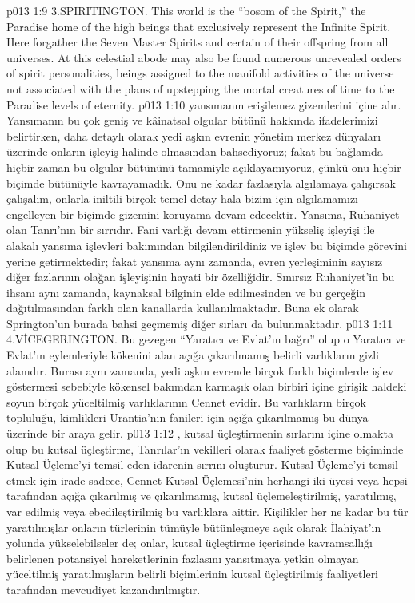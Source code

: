 \vs p013 1:9 3.\bibnobreakspace SPIRITINGTON. This world is the “bosom of the Spirit,” the Paradise home of the high beings that exclusively represent the Infinite Spirit. Here forgather the Seven Master Spirits and certain of their offspring from all universes. At this celestial abode may also be found numerous unrevealed orders of spirit personalities, beings assigned to the manifold activities of the universe not associated with the plans of upstepping the mortal creatures of time to the Paradise levels of eternity.
\vs p013 1:10  yansımanın erişilemez gizemlerini içine alır. Yansımanın bu çok geniş ve kâinatsal olgular bütünü hakkında ifadelerimizi belirtirken, daha detaylı olarak yedi aşkın evrenin yönetim merkez dünyaları üzerinde onların işleyiş halinde olmasından bahsediyoruz; fakat bu bağlamda hiçbir zaman bu olgular bütününü tamamiyle açıklayamıyoruz, çünkü onu hiçbir biçimde bütünüyle kavrayamadık. Onu ne kadar fazlasıyla algılamaya çalışırsak çalışalım, onlarla iniltili birçok temel detay hala bizim için algılamamızı engelleyen bir biçimde gizemini koruyama devam edecektir. Yansıma, Ruhaniyet olan Tanrı’nın bir sırrıdır. Fani varlığı devam ettirmenin yükseliş işleyişi ile alakalı yansıma işlevleri bakımından bilgilendirildiniz ve işlev bu biçimde görevini yerine getirmektedir; fakat yansıma aynı zamanda, evren yerleşiminin sayısız diğer fazlarının olağan işleyişinin hayati bir özelliğidir. Sınırsız Ruhaniyet’in bu ihsanı aynı zamanda, kaynaksal bilginin elde edilmesinden ve bu gerçeğin dağıtılmasından farklı olan kanallarda kullanılmaktadır. Buna ek olarak Springton’un burada bahsi geçmemiş diğer sırları da bulunmaktadır.
\vs p013 1:11 4.\bibnobreakspace VİCEGERINGTON. Bu gezegen “Yaratıcı ve Evlat’ın bağrı” olup o Yaratıcı ve Evlat’ın eylemleriyle kökenini alan açığa çıkarılmamış belirli varlıkların gizli alanıdır. Burası aynı zamanda, yedi aşkın evrende birçok farklı biçimlerde işlev göstermesi sebebiyle kökensel bakımdan karmaşık olan birbiri içine girişik haldeki soyun birçok yüceltilmiş varlıklarının Cennet evidir. Bu varlıkların birçok topluluğu, kimlikleri Urantia’nın fanileri için açığa çıkarılmamış bu dünya üzerinde bir araya gelir.
\vs p013 1:12 , kutsal üçleştirmenin sırlarını içine olmakta olup bu kutsal üçleştirme, Tanrılar’ın vekilleri olarak faaliyet gösterme biçiminde Kutsal Üçleme’yi temsil eden idarenin sırrını oluşturur. Kutsal Üçleme’yi temsil etmek için irade sadece, Cennet Kutsal Üçlemesi’nin herhangi iki üyesi veya hepsi tarafından açığa çıkarılmış ve çıkarılmamış, kutsal üçlemeleştirilmiş, yaratılmış, var edilmiş veya ebedileştirilmiş bu varlıklara aittir. Kişilikler her ne kadar bu tür yaratılmışlar onların türlerinin tümüyle bütünleşmeye açık olarak İlahiyat’ın yolunda yükselebilseler de; onlar, kutsal üçleştirme içerisinde kavramsallığı belirlenen potansiyel hareketlerinin fazlasını yansıtmaya yetkin olmayan yüceltilmiş yaratılmışların belirli biçimlerinin kutsal üçleştirilmiş faaliyetleri tarafından mevcudiyet kazandırılmıştır.
